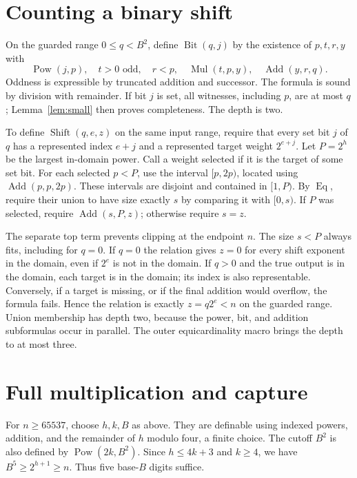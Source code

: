 \documentclass[11pt]{article}
\newcommand{\Eq}{\operatorname{Eq}}
\newcommand{\Add}{\operatorname{Add}}
\newcommand{\Pow}{\operatorname{Pow}}
\newcommand{\Mul}{\operatorname{Mul}}
\newcommand{\Bit}{\operatorname{Bit}}
\newcommand{\Sh}{\operatorname{Shift}}
\begin{document}
\section{Counting a binary shift}\label{s:shift}
On the guarded range \(0\leq q<B^2\), define \(\Bit(q,j)\) by
the existence of \(p,t,r,y\) with
\[
 \Pow(j,p),\quad t>0\text{ odd},\quad r<p,\quad
 \Mul(t,p,y),\quad \Add(y,r,q).
\]
Oddness is expressible by truncated addition and successor. The
formula is sound by division with remainder. If bit \(j\) is set,
all witnesses, including \(p\), are at most \(q\); Lemma~\ref{lem:small}
then proves completeness. The depth is two.

To define \(\Sh(q,e,z)\) on the same input range, require that every
set bit \(j\) of \(q\) has a represented index \(e+j\) and a represented
target weight \(2^{e+j}\). Let \(P=2^h\) be the largest in-domain
power. Call a weight selected if it is the target of some set bit.
For each selected \(p<P\), use the interval \([p,2p)\), located
using \(\Add(p,p,2p)\). These intervals are disjoint and contained
in \([1,P)\). By \(\Eq\), require their union to have size exactly
\(s\) by comparing it with \([0,s)\). If \(P\) was selected, require
\(\Add(s,P,z)\); otherwise require \(s=z\).

The separate top term prevents clipping at the endpoint \(n\).
The size \(s<P\) always fits, including for \(q=0\). If \(q=0\)
the relation gives \(z=0\) for every shift exponent in the domain,
even if \(2^e\) is not in the domain. If \(q>0\) and the true output
is in the domain, each target is in the domain; its index is also
representable. Conversely, if a target is missing, or if the final
addition would overflow, the formula fails. Hence the relation
is exactly \(z=q2^e<n\) on the guarded range. Union membership
has depth two, because the power, bit, and addition subformulas
occur in parallel. The outer equicardinality macro brings the
depth to at most three.

\section{Full multiplication and capture}
For \(n\geq65537\), choose \(h,k,B\) as above. They are definable
using indexed powers, addition, and the remainder of \(h\) modulo
four, a finite choice. The cutoff \(B^2\) is also defined by
\(\Pow(2k,B^2)\). Since \(h\leq4k+3\) and \(k\geq4\), we have
\(B^5\geq2^{h+1}\geq n\). Thus five base-\(B\) digits suffice.
\end{document}
